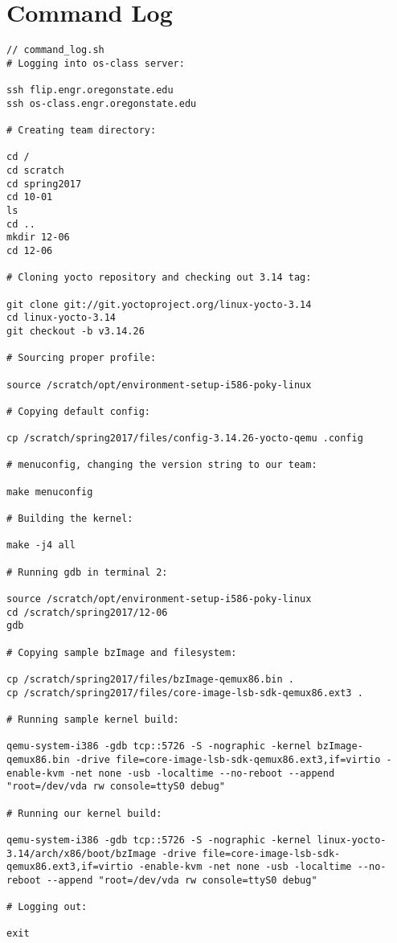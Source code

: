 \documentclass[10pt,onecolumn,journal,draftclsnofoot]{IEEEtran}
\begin{document}
\newpage

\section{Command Log}

\begin{lstlisting}
// command_log.sh
# Logging into os-class server:

ssh flip.engr.oregonstate.edu
ssh os-class.engr.oregonstate.edu

# Creating team directory:

cd /
cd scratch
cd spring2017
cd 10-01
ls
cd ..
mkdir 12-06
cd 12-06

# Cloning yocto repository and checking out 3.14 tag:

git clone git://git.yoctoproject.org/linux-yocto-3.14
cd linux-yocto-3.14
git checkout -b v3.14.26

# Sourcing proper profile:

source /scratch/opt/environment-setup-i586-poky-linux

# Copying default config:

cp /scratch/spring2017/files/config-3.14.26-yocto-qemu .config

# menuconfig, changing the version string to our team:

make menuconfig

# Building the kernel:

make -j4 all

# Running gdb in terminal 2:

source /scratch/opt/environment-setup-i586-poky-linux
cd /scratch/spring2017/12-06
gdb

# Copying sample bzImage and filesystem:

cp /scratch/spring2017/files/bzImage-qemux86.bin .
cp /scratch/spring2017/files/core-image-lsb-sdk-qemux86.ext3 .

# Running sample kernel build:

qemu-system-i386 -gdb tcp::5726 -S -nographic -kernel bzImage-qemux86.bin -drive file=core-image-lsb-sdk-qemux86.ext3,if=virtio -enable-kvm -net none -usb -localtime --no-reboot --append "root=/dev/vda rw console=ttyS0 debug"

# Running our kernel build:

qemu-system-i386 -gdb tcp::5726 -S -nographic -kernel linux-yocto-3.14/arch/x86/boot/bzImage -drive file=core-image-lsb-sdk-qemux86.ext3,if=virtio -enable-kvm -net none -usb -localtime --no-reboot --append "root=/dev/vda rw console=ttyS0 debug"

# Logging out:

exit
\end{lstlisting}
\end{document}
